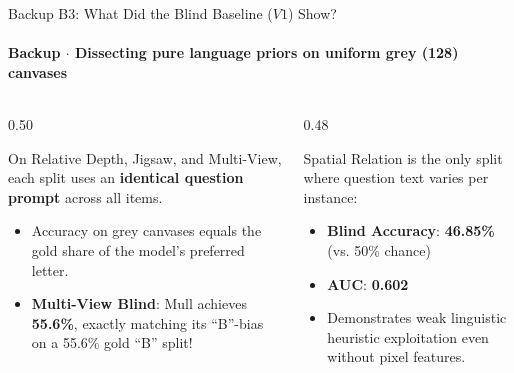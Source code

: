 \documentclass[aspectratio=169, 10pt]{beamer}
\begin{document}
\begin{frame}{Backup B3: What Did the Blind Baseline ($V1$) Show?}
  \framesubtitle{Backup $\cdot$ Dissecting pure language priors on uniform grey (128) canvases}
  
  \begin{columns}[T]
    \begin{column}{0.50\textwidth}
      \begin{tcolorbox}[metriccard, title=\textbf{Fixed-Prompt Benchmark Splits}]
        \small
        On Relative Depth, Jigsaw, and Multi-View, each split uses an \textbf{identical question prompt} across all items.
        \vspace{4pt}
        \begin{itemize}\setlength{\itemsep}{2pt}
          \item Accuracy on grey canvases equals the gold share of the model's preferred letter.
          \item \textbf{Multi-View Blind}: Mull achieves \textbf{55.6\%}, exactly matching its ``B''-bias on a 55.6\% gold ``B'' split!
        \end{itemize}
      \end{tcolorbox}
    \end{column}
    
    \begin{column}{0.48\textwidth}
      \begin{tcolorbox}[accentcard, title=\textbf{Variable-Prompt Split (Spatial Relation)}]
        \small
        Spatial Relation is the only split where question text varies per instance:
        \vspace{4pt}
        \begin{itemize}\setlength{\itemsep}{2pt}
          \item \textbf{Blind Accuracy}: \textbf{46.85\%} (vs. 50\% chance)
          \item \textbf{AUC}: \textbf{0.602}
          \item Demonstrates weak linguistic heuristic exploitation even without pixel features.
        \end{itemize}
      \end{tcolorbox}
    \end{column}
  \end{columns}

\end{frame}
\end{document}

